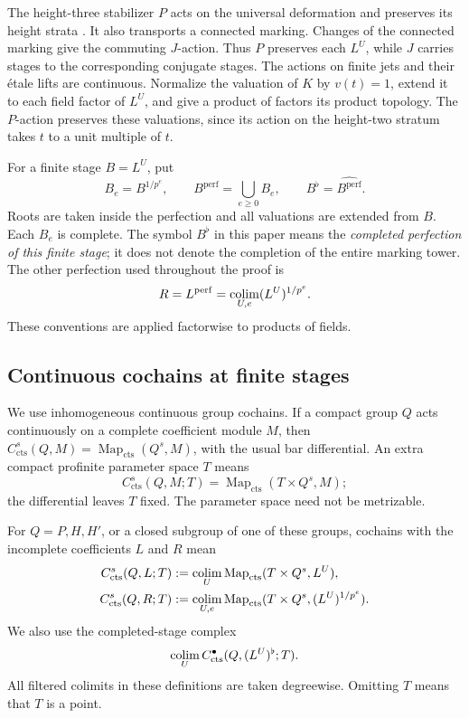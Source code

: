 The height-three stabilizer \(P\) acts on the universal deformation and
preserves its height strata \citep[Proposition~3.3 and paragraph~3.4]{LT66}.
It also transports a connected marking.
Changes of the connected marking give the commuting \(J\)-action.
Thus \(P\) preserves each \(L^U\), while \(J\) carries stages to
the corresponding conjugate stages.
The actions on finite jets and their \'etale lifts are continuous.
Normalize the valuation of \(K\) by \(v(t)=1\), extend it to each
field factor of \(L^U\), and give a product of factors its product
topology. The \(P\)-action preserves these valuations, since its
action on the height-two stratum takes \(t\) to a unit multiple of
\(t\).

For a finite stage \(B=L^U\), put
\[
 B_e=B^{1/p^e},\qquad
 B^{\mathrm{perf}}=\bigcup_{e\geq0}B_e,\qquad
 B^\flat=\widehat{B^{\mathrm{perf}}}.
\]
Roots are taken inside the perfection and all valuations are
extended from \(B\). Each \(B_e\) is complete. The symbol \(B^\flat\)
in this paper means the \emph{completed perfection of this finite
stage}; it does not denote the completion of the entire marking
tower. The other perfection used throughout the proof is
\[
                         R=L^{\mathrm{perf}}
                          =\operatorname*{colim}_{U,e}(L^U)^{1/p^e}.
\]
These conventions are applied factorwise to products of fields.

\subsection{Continuous cochains at finite stages}

We use inhomogeneous continuous group cochains. If a compact group
\(Q\) acts continuously on a complete coefficient module \(M\), then
\(C^s_{\mathrm{cts}}(Q,M)=
\operatorname{Map}_{\mathrm{cts}}(Q^s,M)\), with the usual bar
differential. An extra compact profinite parameter space \(T\)
means
\[
 C^s_{\mathrm{cts}}(Q,M;T)
       =\operatorname{Map}_{\mathrm{cts}}(T\times Q^s,M);
\]
the differential leaves \(T\) fixed.
The parameter space need not be metrizable.

\begin{definition}\label{def:stage-cochains}
For \(Q=P,H,H'\), or a closed subgroup of one of these groups,
cochains with the incomplete coefficients \(L\) and \(R\) mean
\begin{align}
 C^s_{\mathrm{cts}}(Q,L;T)
   &:=\operatorname*{colim}_U
       \operatorname{Map}_{\mathrm{cts}}(T\times Q^s,L^U),
       \nonumber\\
 C^s_{\mathrm{cts}}(Q,R;T)
   &:=\operatorname*{colim}_{U,e}
       \operatorname{Map}_{\mathrm{cts}}
            (T\times Q^s,(L^U)^{1/p^e}).
       \label{eq:stage-cochains}
\end{align}
We also use the completed-stage complex
\begin{equation}\label{eq:completed-stage-cochains}
 \operatorname*{colim}_U C^\bullet_{\mathrm{cts}}(Q,(L^U)^\flat;T).
\end{equation}
All filtered colimits in these definitions are taken degreewise.
Omitting \(T\) means that \(T\) is a point.
\end{definition}

